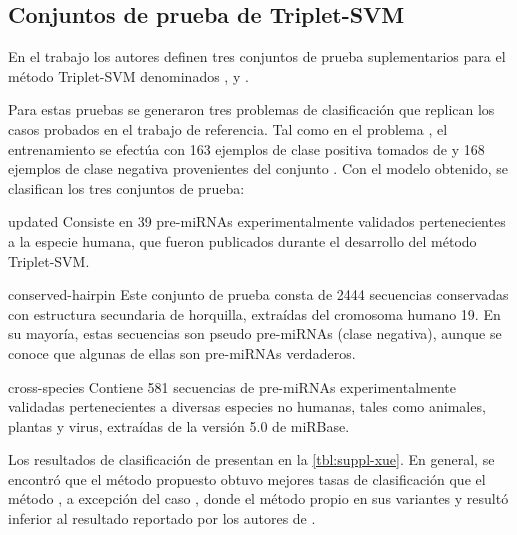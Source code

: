 %
%
\subsection{Conjuntos de prueba de Triplet-SVM}
%
En el trabajo \cite{xue} los autores definen tres conjuntos de prueba
suplementarios para el método Triplet-SVM denominados ,
 y .

Para estas pruebas se generaron tres problemas de clasificación que
replican los casos probados en el trabajo de referencia.
Tal como en el problema \tripletsvm{}, el entrenamiento se efectúa con
163 ejemplos de clase positiva tomados de  y 168
ejemplos de clase negativa provenientes del conjunto .
Con el modelo obtenido, se clasifican los tres conjuntos de prueba:
%
\begin{description}
  \item{updated}
  Consiste en 39 pre-miRNAs experimentalmente validados pertenecientes a
  la especie humana, que fueron publicados durante el desarrollo del
  método Triplet-SVM.
%
  \item{conserved-hairpin}
  Este conjunto de prueba consta de 2444 secuencias conservadas con
  estructura secundaria de horquilla, extraídas del cromosoma humano
  19. En su mayoría, estas secuencias son pseudo pre-miRNAs (clase
  negativa), aunque se conoce que algunas de ellas son
  pre-miRNAs verdaderos.
%
  \item{cross-species}
  Contiene 581 secuencias de pre-miRNAs experimentalmente validadas
  pertenecientes a diversas especies no humanas, tales como animales,
  plantas y virus, extraídas de la versión 5.0 de miRBase.
\end{description}
%
Los resultados de clasificación de presentan en la
\autoref{tbl:suppl-xue}.
En general, se encontró que el método propuesto obtuvo mejores tasas
de clasificación que el método \tripletsvm{}, a excepción del caso
, donde el método propio en sus variantes
 y  resultó inferior al resultado reportado por
los autores de \cite{xue}.
